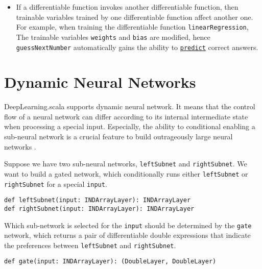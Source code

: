 \begin{itemize}
  \item If a \gls{differentiable function} invokes another \gls{differentiable function}, then \glspl{trainable variable} trained by one \gls{differentiable function} affect another one. For example, when training the \gls{differentiable function} \lstinline{linearRegression}, The \glspl{trainable variable} \lstinline{weights} and \lstinline{bias} are modified, hence \lstinline{guessNextNumber} automatically gains the ability to \href{https://javadoc.io/page/com.thoughtworks.deeplearning/deeplearning_2.11/latest/com/thoughtworks/deeplearning/DeepLearning.html#predict(differentiable:Differentiable):com.thoughtworks.future.Future[DeepLearning.this.Data]}{\lstinline{predict}} correct answers.
\end{itemize}

\section{Dynamic Neural Networks}

DeepLearning.scala supports dynamic neural network. It means that the control flow of a neural network can differ according to its internal intermediate state when processing a special input. Especially, the ability to conditional enabling a sub-neural network is a crucial feature to build outrageously large neural networks \cite{shazeer2017outrageously}.

Suppose we have two sub-neural networks, \lstinline{leftSubnet} and \lstinline{rightSubnet}. We want to build a gated network, which conditionally runs either \lstinline{leftSubnet} or \lstinline{rightSubnet} for a special \lstinline{input}.

\begin{lstlisting}[float={h t b p},caption={Predefined sub-networks}]
def leftSubnet(input: INDArrayLayer): INDArrayLayer
def rightSubnet(input: INDArrayLayer): INDArrayLayer
\end{lstlisting}

Which sub-network is selected for the \lstinline{input} should be determined by the \lstinline{gate} network, which returns a pair of differentiable double expressions that indicate the preferences between \lstinline{leftSubnet} and \lstinline{rightSubnet}.

\begin{lstlisting}[float={h t b p},caption={Predefined gate network}]
def gate(input: INDArrayLayer): (DoubleLayer, DoubleLayer)
\end{lstlisting}

